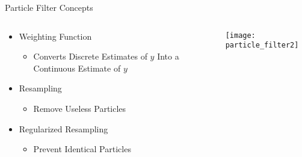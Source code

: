 \begin{frame}{Particle Filter Concepts}
\small
\begin{columns}
\begin{column}{.5\textwidth}
\begin{itemize}
    \item Weighting Function
        \begin{itemize}
            \item Converts Discrete Estimates of $y$ 
                    Into a Continuous Estimate of $y$
        \end{itemize}
    \item Resampling
    \begin{itemize}
        \item Remove Useless Particles
    \end{itemize}
    \item Regularized Resampling
    \begin{itemize}
        \item Prevent Identical Particles
    \end{itemize}
\end{itemize}
\end{column}

\begin{column}{.5\textwidth}
\texttt{[image: particle\_filter2]}
\end{column}
\end{columns}
\end{frame}

